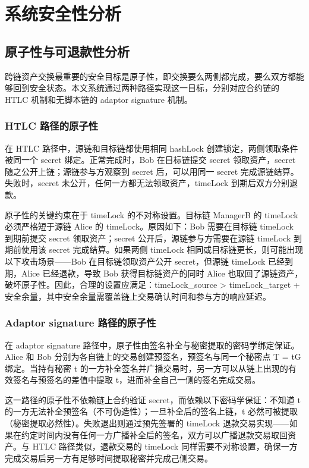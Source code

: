 
\chapter{系统安全性分析}


\section{原子性与可退款性分析}


跨链资产交换最重要的安全目标是原子性，即交换要么两侧都完成，要么双方都能够回到安全状态。本文系统通过两种路径实现这一目标，分别对应合约链的 HTLC 机制和无脚本链的 adaptor signature 机制。


\subsection{HTLC 路径的原子性}


在 HTLC 路径中，源链和目标链都使用相同 hashLock 创建锁定，两侧领取条件被同一个 secret 绑定。正常完成时，Bob 在目标链提交 secret 领取资产，secret 随之公开上链；源链参与方观察到 secret 后，可以用同一 secret 完成源链结算。失败时，secret 未公开，任何一方都无法领取资产，timeLock 到期后双方分别退款。


原子性的关键约束在于 timeLock 的不对称设置。目标链 ManagerB 的 timeLock 必须严格短于源链 Alice 的 timeLock。原因如下：Bob 需要在目标链 timeLock 到期前提交 secret 领取资产；secret 公开后，源链参与方需要在源链 timeLock 到期前使用该 secret 完成结算。如果两侧 timeLock 相同或目标链更长，则可能出现以下攻击场景——Bob 在目标链领取资产公开 secret，但源链 timeLock 已经到期，Alice 已经退款，导致 Bob 获得目标链资产的同时 Alice 也取回了源链资产，破坏原子性。因此，合理的设置应满足：timeLock\_source \textgreater{} timeLock\_target + 安全余量，其中安全余量需覆盖链上交易确认时间和参与方的响应延迟。


\subsection{Adaptor signature 路径的原子性}


在 adaptor signature 路径中，原子性由签名补全与秘密提取的密码学绑定保证。Alice 和 Bob 分别为各自链上的交易创建预签名，预签名与同一个秘密点 T = tG 绑定。当持有秘密 t 的一方补全签名并广播交易时，另一方可以从链上出现的有效签名与预签名的差值中提取 t，进而补全自己一侧的签名完成交易。


这一路径的原子性不依赖链上合约验证 secret，而依赖以下密码学保证：不知道 t 的一方无法补全预签名（不可伪造性）；一旦补全后的签名上链，t 必然可被提取（秘密提取必然性）。失败退出则通过预先签署的 timeLock 退款交易实现——如果在约定时间内没有任何一方广播补全后的签名，双方可以广播退款交易取回资产。与 HTLC 路径类似，退款交易的 timeLock 同样需要不对称设置，确保一方完成交易后另一方有足够时间提取秘密并完成己侧交易。


